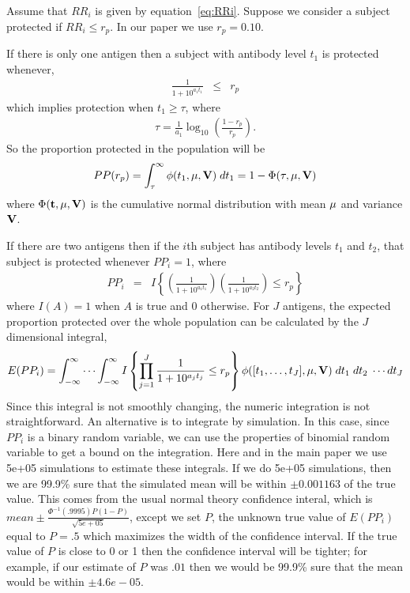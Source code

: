 \documentclass{article}[12pt]
\begin{document}
Assume that $RR_i$ is given by equation~\ref{eq:RRi}. Suppose we consider a subject protected if $RR_i \leq r_p$. 
In our paper we use $r_p=0.10$. 


If there is only one antigen then a subject with antibody level $t_1$ is protected whenever, 
\begin{eqnarray*}
\frac{ 1}{1+10^{a_1  t_{1}   } }  & \leq & r_p 
\end{eqnarray*}
which implies protection when $t_1 \geq \tau$, where  
\begin{eqnarray*}
 \tau =  \frac{1}{a_1} \log_{10} \left( \frac{1-r_p}{r_p} \right). 
\end{eqnarray*}
So the proportion protected in the population will be 
\begin{eqnarray}
PP(r_p) = \int_{\tau}^{\infty} \phi(t_1,{\bf \mu}, {\bf V}) \; dt_1  = 1 - \Phi(\tau,{\bf \mu}, {\bf V})
\label{eq:pp1}
\end{eqnarray}
where $\Phi({\bf t},{\bf \mu}, {\bf V})$ is the cumulative normal distribution with mean ${\bf \mu}$ and variance ${\bf V}$. 

If there are two antigens then if the $i$th subject has antibody levels $t_1$ and $t_2$, that subject is protected whenever $PP_i=1$,
where  
\begin{eqnarray*}
PP_i &= & I \left\{ \left( \frac{1}{1+10^{a_1  t_1} } \right)  \left( \frac{1}{1+10^{a_2  t_2}} \right)   \leq   r_p \right\}
\end{eqnarray*}
where $I(A)=1$ when $A$ is true and 0 otherwise. 
For $J$ antigens, the expected proportion protected over the whole population can be calculated by the $J$ dimensional integral, 
\begin{eqnarray}
E(PP_i) = \int_{-\infty}^{\infty} \cdots \int_{-\infty}^{\infty}  I \left\{  \prod_{j=1}^{J} \frac{ 1}{1+10^{a_j  t_{j}   } }  \leq r_p \right\} 
\phi([t_1,\ldots,t_J],{\bf \mu}, {\bf V}) \; dt_1 \; dt_2 \; \cdots dt_J
\label{eq:meanPPj}
\end{eqnarray}
Since this integral is not smoothly changing, the numeric integration is not straightforward. An alternative is to integrate by simulation. 
In this case, since $PP_i$ is a binary random variable, we can use the properties of binomial random variable to get a bound on the integration. 
Here and in the main paper we use 5e+05 simulations to estimate these integrals.
If we do 5e+05 simulations, then we are 99.9\% sure that the simulated mean will be within 
$\pm 0.001163$ 
of the true value. 
This comes from the usual normal theory confidence interal, which is 
$mean \pm \frac{ \Phi^{-1}(.9995) P(1-P)}{\sqrt{5e+05}}$, except we set $P$,
the unknown true value of $E(PP_i)$ equal to $P=.5$ which maximizes the width of the 
confidence interval. If the true value of $P$ is close to 0 or 1 then the confidence interval will be tighter; for example, 
if our estimate of $P$ was  $.01$ then we would be 99.9\% sure that the mean would be within 
$\pm 4.6e-05$. 
\end{document}
